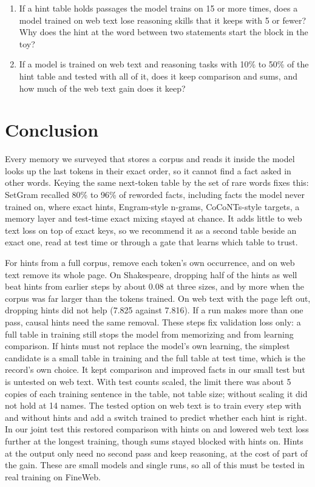 \documentclass[11pt]{article}
\begin{document}
\begin{enumerate}
\item If a hint table holds passages the model trains on 15 or more times, does a model trained on web text lose reasoning skills that it keeps with 5 or fewer? Why does the hint at the word between two statements start the block in the toy?
\item If a model is trained on web text and reasoning tasks with 10\% to 50\% of the hint table and tested with all of it, does it keep comparison and sums, and how much of the web text gain does it keep?
\end{enumerate}

\section{Conclusion}
Every memory we surveyed that stores a corpus and reads it inside the model looks up the last tokens in their exact order, so it cannot find a fact asked in other words. Keying the same next-token table by the set of rare words fixes this: SetGram recalled 80\% to 96\% of reworded facts, including facts the model never trained on, where exact hints, Engram-style n-grams, CoCoNTs-style targets, a memory layer and test-time exact mixing stayed at chance. It adds little to web text loss on top of exact keys, so we recommend it as a second table beside an exact one, read at test time or through a gate that learns which table to trust.

For hints from a full corpus, remove each token's own occurrence, and on web text remove its whole page. On Shakespeare, dropping half of the hints as well beat hints from earlier steps by about 0.08 at three sizes, and by more when the corpus was far larger than the tokens trained. On web text with the page left out, dropping hints did not help (7.825 against 7.816). If a run makes more than one pass, causal hints need the same removal. These steps fix validation loss only: a full table in training still stops the model from memorizing and from learning comparison. If hints must not replace the model's own learning, the simplest candidate is a small table in training and the full table at test time, which is the record's own choice. It kept comparison and improved facts in our small test but is untested on web text. With test counts scaled, the limit there was about 5 copies of each training sentence in the table, not table size; without scaling it did not hold at 14 names. The tested option on web text is to train every step with and without hints and add a switch trained to predict whether each hint is right. In our joint test this restored comparison with hints on and lowered web text loss further at the longest training, though sums stayed blocked with hints on. Hints at the output only need no second pass and keep reasoning, at the cost of part of the gain. These are small models and single runs, so all of this must be tested in real training on FineWeb.
\end{document}
